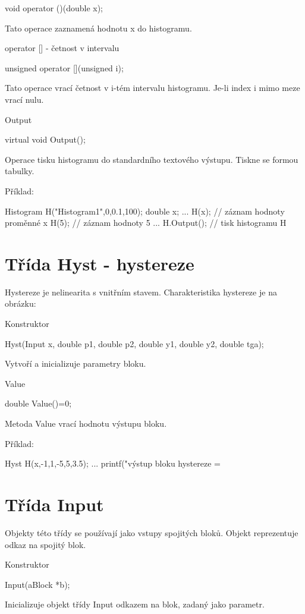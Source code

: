 \documentclass[a4paper]{article}
\begin{document}
  void operator ()(double x);


Tato operace zaznamená hodnotu x do histogramu.


operator [] - četnost v intervalu

  unsigned operator [](unsigned i);


Tato operace vrací četnost v i-tém intervalu histogramu.
Je-li index i mimo meze vrací nulu.


Output

  virtual void Output();


Operace tisku histogramu do standardního textového výstupu. Tiskne
se formou tabulky.

Příklad:

Histogram H("Histogram1",0,0.1,100);
double x;
  ...
  H(x);           // záznam hodnoty proměnné x
  H(5);           // záznam hodnoty 5
  ...
  H.Output();     // tisk histogramu H



\section{Třída Hyst - hystereze}

Hystereze je nelinearita s vnitřním stavem. Charakteristika hystereze
je na obrázku:


Konstruktor

  Hyst(Input x, double p1, double p2, double y1, double y2, double  tga);


Vytvoří a inicializuje parametry bloku.


Value

  double Value()=0;


Metoda Value vrací hodnotu výstupu bloku.

Příklad:

Hyst H(x,-1,1,-5,5,3.5);
  ...
  printf("výstup bloku hystereze =%



\section{Třída Input}

Objekty této třídy se používají jako vstupy spojitých bloků. Objekt
reprezentuje odkaz na spojitý blok.


Konstruktor

  Input(aBlock *b);


Inicializuje objekt třídy Input odkazem na blok, zadaný jako parametr.
\end{document}
